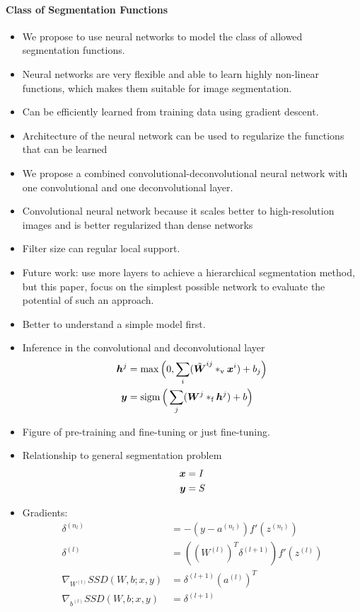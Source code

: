 \paragraph{Class of Segmentation Functions}
\begin{itemize}
\item We propose to use neural networks to model the class of allowed
segmentation functions.
\item Neural networks are very flexible and able to learn highly non-linear
functions, which makes them suitable for image segmentation.
\item Can be efficiently learned from training data using gradient descent.
\item Architecture of the neural network can be used to regularize the functions
that can be learned
\item We propose a combined convolutional-deconvolutional neural network with
one convolutional and one deconvolutional layer.
\item Convolutional neural network because it scales better to high-resolution
images and is better regularized than dense networks
\item Filter size can regular local support.
\item Future work: use more layers to achieve a hierarchical segmentation
method, but this paper, focus on the simplest possible network to evaluate the
potential of such an approach.
\item Better to understand a simple model first.
\item Inference in the convolutional and deconvolutional layer
\begin{align}
\vect{h}^j &=
\max\Big(0, \sum_{i}(\tilde{\vect{W}}^{ij}*_\text{v}\vect{x}^i) +
b_j\Big)
\\
\vect{y} &= \sigm\Big(\sum_{j}(\vect{W}^{j}*_\text{f}\vect{h}^j) +
b\Big)
\end{align}
\item Figure of pre-training and fine-tuning or just fine-tuning.
\item Relationship to general segmentation problem
\begin{align}
\vect{x} &= I \\
\vect{y} &= S 
\end{align}
\item Gradients:
\begin{align}
\delta^{(n_l)}&=-(y-a^{(n_l)})f'(z^{(n_l)}) \\
\delta^{(l)}&=((W^{(l)})^T\delta^{(l+1)})f'(z^{(l)})\\
\nabla_{W^{(l)}}SSD(W,b;x,y)&=\delta^{(l+1)}(a^{(l)})^T\\
\nabla_{b^{(l)}}SSD(W,b;x,y)&=\delta^{(l+1)}
\end{align}
\end{itemize}

